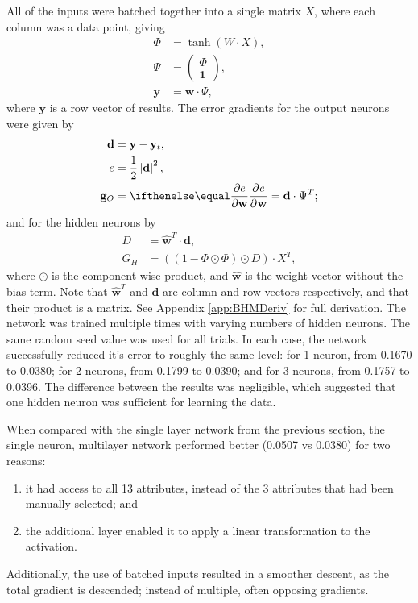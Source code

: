 All of the inputs were batched together into a single matrix $X$, where each
column was a data point, giving
\begin{align*}
    \Phi &= \tanh(W\cdot X),\\
    \Psi &= \begin{pmatrix} \Phi \\ \mathbf{1} \end{pmatrix},\\
    \mathbf{y} &= \mathbf{w}\cdot\Psi,
\end{align*}
where $\mathbf{y}$ is a row vector of results.
The error gradients for the output neurons were given by
\begin{align*}
    \mathbf{d} &= \mathbf{y} - \mathbf{y}_t,\\
    e &= \frac{1}{2}\left|\mathbf{d}\right|^2,\\
    \mathbf{g}_O &= \Rpdiff{e}{\mathbf{w}} = \mathbf{d}\cdot\Psi^T;
\end{align*}
and for the hidden neurons by
\begin{align*}
    D &= \hat{\mathbf{w}}^T\cdot\mathbf{d},\\
    G_H &= ((1 - \Phi\odot\Phi)\odot D) \cdot X^T,
\end{align*}
where $\odot$ is the component-wise product, and $\hat{\mathbf{w}}$ is the
weight vector without the bias term.
Note that $\hat{\mathbf{w}}^T$ and $\mathbf{d}$ are column and row vectors
respectively, and that their product is a matrix.
See Appendix \ref{app:BHMDeriv} for full derivation.
The network was trained multiple times with varying numbers of hidden neurons.
The same random seed value was used for all trials.
In each case, the network successfully reduced it's error to roughly the same
level:
for 1 neuron, from 0.1670 to 0.0380;
for 2 neurons, from 0.1799 to 0.0390; and
for 3 neurons, from 0.1757 to 0.0396.
The difference between the results was negligible, which suggested that one
hidden neuron was sufficient for learning the data.

When compared with the single layer network from the previous section, the
single neuron, multilayer network performed better (0.0507 vs 0.0380) for two
reasons:
\begin{enumerate}
    \item it had access to all 13 attributes, instead of the 3 attributes that
        had been manually selected; and
    \item the additional layer enabled it to apply a linear transformation to
        the activation.
\end{enumerate}
Additionally, the use of batched inputs resulted in a smoother descent, as the
total gradient is descended; instead of multiple, often opposing gradients.



